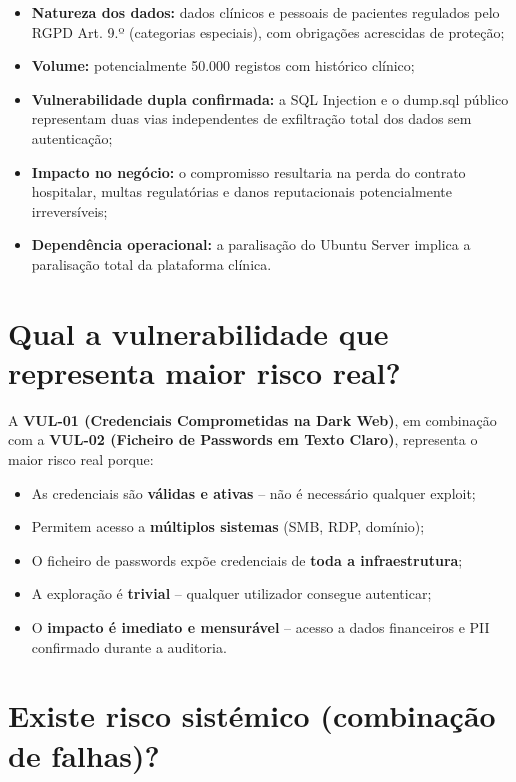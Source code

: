 \documentclass[12pt, a4paper]{report}
\begin{document}
\begin{itemize}[itemsep=2pt]
  \item \textbf{Natureza dos dados:} dados clínicos e pessoais de pacientes regulados pelo
        RGPD Art. 9.º (categorias especiais), com obrigações acrescidas de proteção;
  \item \textbf{Volume:} potencialmente 50.000 registos com histórico clínico;
  \item \textbf{Vulnerabilidade dupla confirmada:} a SQL Injection e o dump.sql público
        representam duas vias independentes de exfiltração total dos dados sem autenticação;
  \item \textbf{Impacto no negócio:} o compromisso resultaria na perda do contrato hospitalar,
        multas regulatórias e danos reputacionais potencialmente irreversíveis;
  \item \textbf{Dependência operacional:} a paralisação do Ubuntu Server implica a paralisação
        total da plataforma clínica.
\end{itemize}

\section{Qual a vulnerabilidade que representa maior risco real?}

A \textbf{VUL-01 (Credenciais Comprometidas na Dark Web)}, em combinação com a
\textbf{VUL-02 (Ficheiro de Passwords em Texto Claro)}, representa o maior risco real porque:

\begin{itemize}[itemsep=2pt]
  \item As credenciais são \textbf{válidas e ativas} -- não é necessário qualquer exploit;
  \item Permitem acesso a \textbf{múltiplos sistemas} (SMB, RDP, domínio);
  \item O ficheiro de passwords expõe credenciais de \textbf{toda a infraestrutura};
  \item A exploração é \textbf{trivial} -- qualquer utilizador consegue autenticar;
  \item O \textbf{impacto é imediato e mensurável} -- acesso a dados financeiros e PII
        confirmado durante a auditoria.
\end{itemize}

\section{Existe risco sistémico (combinação de falhas)?}
\end{document}
